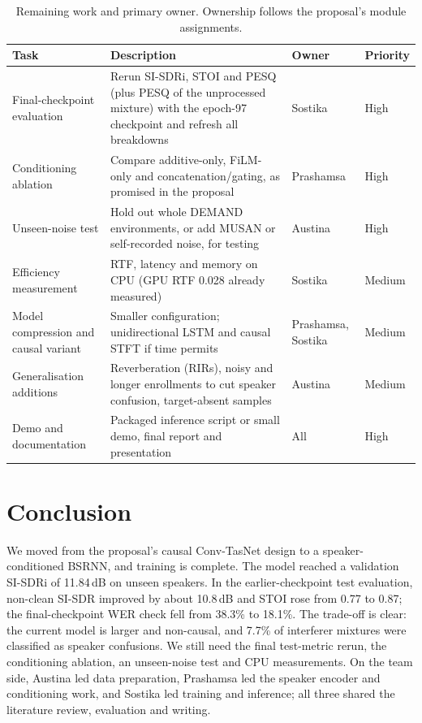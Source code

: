\documentclass[11pt,a4paper]{article}
\newcommand{\sisdr}{SI-SDR}
\newcommand{\sisdri}{SI-SDRi}
\begin{document}
\begin{table}[H]
\centering\small
\caption{Remaining work and primary owner. Ownership follows the proposal's module assignments.}
\label{tab:plan}
\begin{tabularx}{\textwidth}{@{}>{\raggedright\arraybackslash}p{4.1cm} Y >{\raggedright\arraybackslash}p{2.5cm} l@{}}
\toprule
\textbf{Task} & \textbf{Description} & \textbf{Owner} & \textbf{Priority}\\
\midrule
Final-checkpoint evaluation & Rerun \sisdri, STOI and PESQ (plus PESQ of the unprocessed mixture)
  with the epoch-97 checkpoint and refresh all breakdowns & Sostika & High\\
Conditioning ablation & Compare additive-only, FiLM-only and concatenation/gating, as promised in
  the proposal & Prashamsa & High\\
Unseen-noise test & Hold out whole DEMAND environments, or add MUSAN or self-recorded noise, for
  testing & Austina & High\\
Efficiency measurement & RTF, latency and memory on CPU (GPU RTF 0.028 already measured) & Sostika & Medium\\
Model compression and causal variant & Smaller configuration; unidirectional LSTM and causal STFT
  if time permits & Prashamsa, Sostika & Medium\\
Generalisation additions & Reverberation (RIRs), noisy and longer enrollments to cut speaker
  confusion, target-absent samples & Austina & Medium\\
Demo and documentation & Packaged inference script or small demo, final report and presentation &
  All & High\\
\bottomrule
\end{tabularx}
\end{table}

\section{Conclusion}
We moved from the proposal's causal Conv-TasNet design to a speaker-conditioned BSRNN, and
training is complete. The model reached a validation \sisdri{} of 11.84\,dB on unseen speakers. In
the earlier-checkpoint test evaluation, non-clean \sisdr{} improved by about 10.8\,dB and STOI
rose from 0.77 to 0.87; the final-checkpoint WER check fell from 38.3\% to 18.1\%. The trade-off
is clear: the current model is larger and non-causal, and 7.7\% of interferer mixtures were
classified as speaker confusions. We still need the final test-metric rerun, the conditioning
ablation, an unseen-noise test and CPU measurements. On the team side, Austina led data
preparation, Prashamsa led the speaker encoder and conditioning work, and Sostika led training
and inference; all three shared the literature review, evaluation and writing.
\end{document}
